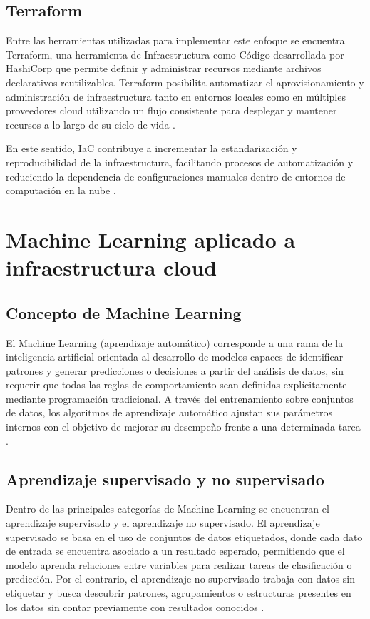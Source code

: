 \subsection{Terraform}

Entre las herramientas utilizadas para implementar este enfoque se encuentra Terraform, una herramienta de Infraestructura como Código desarrollada por HashiCorp que permite definir y administrar recursos mediante archivos declarativos reutilizables. Terraform posibilita automatizar el aprovisionamiento y administración de infraestructura tanto en entornos locales como en múltiples proveedores cloud utilizando un flujo consistente para desplegar y mantener recursos a lo largo de su ciclo de vida \parencite{HashiCorp2026}.

En este sentido, IaC contribuye a incrementar la estandarización y reproducibilidad de la infraestructura, facilitando procesos de automatización y reduciendo la dependencia de configuraciones manuales dentro de entornos de computación en la nube \parencite{Microsoft2025, HashiCorp2026}.

\section{Machine Learning aplicado a infraestructura cloud}

\subsection{Concepto de Machine Learning}

El Machine Learning (aprendizaje automático) corresponde a una rama de la inteligencia artificial orientada al desarrollo de modelos capaces de identificar patrones y generar predicciones o decisiones a partir del análisis de datos, sin requerir que todas las reglas de comportamiento sean definidas explícitamente mediante programación tradicional. A través del entrenamiento sobre conjuntos de datos, los algoritmos de aprendizaje automático ajustan sus parámetros internos con el objetivo de mejorar su desempeño frente a una determinada tarea \parencite{Forghani2020}.

\subsection{Aprendizaje supervisado y no supervisado}

Dentro de las principales categorías de Machine Learning se encuentran el aprendizaje supervisado y el aprendizaje no supervisado. El aprendizaje supervisado se basa en el uso de conjuntos de datos etiquetados, donde cada dato de entrada se encuentra asociado a un resultado esperado, permitiendo que el modelo aprenda relaciones entre variables para realizar tareas de clasificación o predicción. Por el contrario, el aprendizaje no supervisado trabaja con datos sin etiquetar y busca descubrir patrones, agrupamientos o estructuras presentes en los datos sin contar previamente con resultados conocidos \parencite{Forghani2020}.

